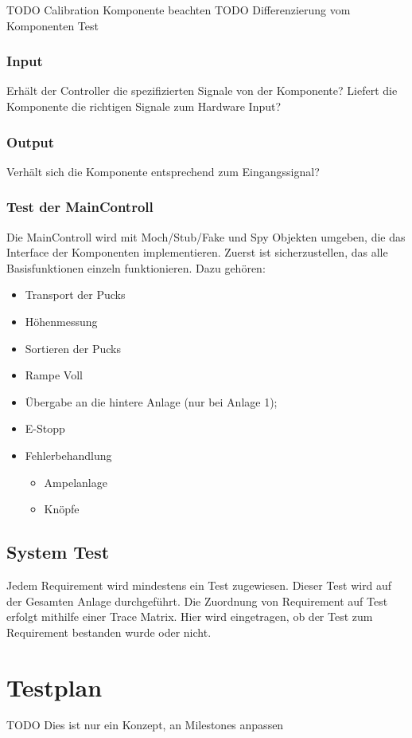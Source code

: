 TODO Calibration Komponente beachten
TODO Differenzierung vom Komponenten Test

\subsubsection{Input}
Erhält der Controller die spezifizierten Signale von der Komponente? Liefert die Komponente die richtigen Signale zum Hardware Input?

\subsubsection{Output}
Verhält sich die Komponente entsprechend zum Eingangssignal?

\subsubsection{Test der MainControll}
Die MainControll wird mit Moch/Stub/Fake und Spy Objekten umgeben, die das Interface der Komponenten implementieren.
Zuerst ist sicherzustellen, das alle Basisfunktionen einzeln funktionieren. Dazu gehören:
\begin{itemize} 
	\item Transport der Pucks
	\item Höhenmessung
	\item Sortieren der Pucks
	\item Rampe Voll
	\item Übergabe an die hintere Anlage (nur bei Anlage 1);
	\item E-Stopp
	\item Fehlerbehandlung
	\begin{itemize}
		\item Ampelanlage
		\item Knöpfe
	\end{itemize}
\end{itemize}

\subsection{System Test}
Jedem Requirement wird mindestens ein Test zugewiesen. Dieser Test wird auf der Gesamten Anlage durchgeführt. 
Die Zuordnung von Requirement auf Test erfolgt mithilfe einer Trace Matrix.
Hier wird eingetragen, ob der Test zum Requirement bestanden wurde oder nicht.

\section{Testplan}
TODO Dies ist nur ein Konzept, an Milestones anpassen
